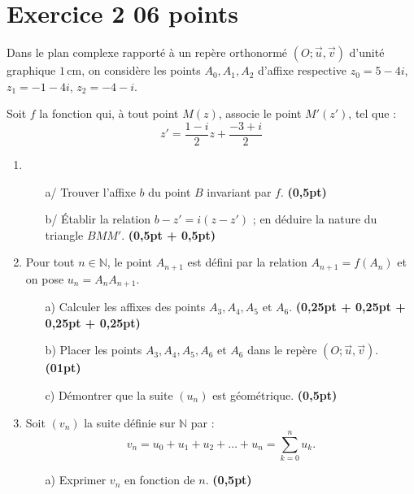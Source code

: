 \documentclass[12pt]{article}
\begin{document}
\section*{Exercice 2 \hfill 06 points}

Dans le plan complexe rapporté à un repère orthonormé \( (O ; \vec{u}, \vec{v}) \) d’unité graphique \( 1\,\text{cm} \), on considère les points \( A_0, A_1, A_2 \) d’affixe respective \( z_0 = 5 - 4i \), \( z_1 = -1 - 4i \), \( z_2 = -4 - i \).

Soit \( f \) la fonction qui, à tout point \( M(z) \), associe le point \( M'(z') \), tel que :
\[
z' = \frac{1 - i}{2} z + \frac{-3 + i}{2}
\]

\begin{enumerate}
    \item 
    \begin{enumerate}
        \item[a/] Trouver l’affixe \( b \) du point \( B \) invariant par \( f \). \hfill \textbf{(0,5pt)}
        
        \item[b/] Établir la relation \( b - z' = i(z - z') \) ; en déduire la nature du triangle \( BMM' \). \hfill \textbf{(0,5pt + 0,5pt)}
    \end{enumerate}

    \item Pour tout \( n \in \mathbb{N} \), le point \( A_{n+1} \) est défini par la relation \( A_{n+1} = f(A_n) \) et on pose \( u_n = A_n A_{n+1} \).
    \begin{enumerate}
        \item[a)] Calculer les affixes des points \( A_3, A_4, A_5 \) et \( A_6 \). \hfill \textbf{(0,25pt + 0,25pt + 0,25pt + 0,25pt)}
        
        \item[b)] Placer les points \( A_3, A_4, A_5, A_6 \) et \( A_6 \) dans le repère \( (O ; \vec{u}, \vec{v}) \). \hfill \textbf{(01pt)}
        
        \item[c)] Démontrer que la suite \( (u_n) \) est géométrique. \hfill \textbf{(0,5pt)}
    \end{enumerate}
    
    \item Soit \( (v_n) \) la suite définie sur \( \mathbb{N} \) par :
    \[
    v_n = u_0 + u_1 + u_2 + \dots + u_n = \sum_{k=0}^{n} u_k.
    \]
    \begin{enumerate}
        \item[a)] Exprimer \( v_n \) en fonction de \( n \). \hfill \textbf{(0,5pt)}
        

\end{enumerate}
\end{enumerate}
\end{document}
